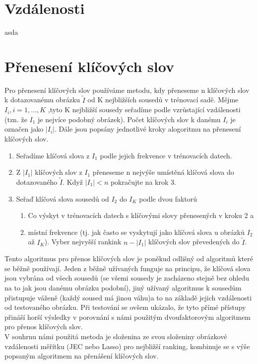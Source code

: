 \documentclass[czech,BP]{thesiskiv}
\begin{document}
\section{Vzdálenosti}
asda
\section{Přenesení klíčových slov}
Pro přenesení klíčových slov používáme metodu, kdy přeneseme n klíčových slov k dotazovanému obrázku $\tilde{I}$ od K nejbližších sousedů v trénovací sadě. Mějme $I_{i}, i = 1, ..., K$ ,tyto K nejbližší sousedy seřadíme podle vzrůstající vzdálenosti (tzn. že $I_{1} $ je nejvíce podobný obrázek). Počet klíčových slov k danému $I_{i}$ je označen jako $|I_{i}|$. Dále jsou popsány jednotlivé kroky alogoritmu na přenesení klíčových slov.
\begin{enumerate}
	\item Seřadíme klíčová slova z $I_{1}$ podle jejich frekvence v trénovacích datech.
	\item Z $|I_{1}|$ klíčových slov z $I_{1}$ přeneseme n nejvýše umístěná klíčová slova do dotazovaného $\tilde{I}$. Když $|I_{1}| < n$ pokračujte na krok 3. 
	\item Seřaď klíčová slova sousedů od $I_{2}$ do $I_{K}$ podle dvou faktorů
	\begin{enumerate}
		\item Co výskyt v trénovacích datech s klíčovými slovy přenesených v kroku 2 a
		\item místní frekvence (tj. jak často se vyskytují jako klíčová slova u obrázků $I_{2}$ až $I_{K}$). Vyber nejvyšší rankink $n-|I_{1}|$ klíčových slov převedených do $\tilde{I}$.
	\end{enumerate}
\end{enumerate}

Tento algoritmus pro přenos klíčových slov je poněkud odlišný od algoritmů které se běžně používají. Jeden z běžně užívaných funguje na principu, že klíčová slova jsou vybrána od všech sousedů (se všemi sousedy je zacházeno stejně bez ohledu na to jak jsou danému obrázku podobní), jiný užívaný algoritmus k sousedům přistupuje váženě (každý soused má jinou váhu)a to na základě jejich vzdálenosti od testovaného obrázku. Při testování se ovšem ukázalo, že tyto přímé přístupy přináší horší výsledky v porovnání s námi použitým dvoufaktorovým algoritmem pro přenos klíčových slov. \\
V souhrnu námi použitá metoda je složenina ze svou složeniny obrázkové vzdálenosti měřítku (JEC nebo Lasso) pro nejbližší ranking, kombinuje se s výše popsaným algoritmem na přenášení klíčových slov.
\end{document}
